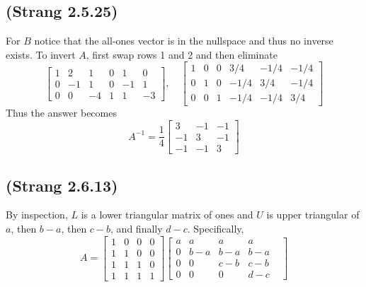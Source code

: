 \documentclass[10pt]{article}
\begin{document}
\subsection{(Strang 2.5.25)}
For $B$ notice that the all-ones vector is in the nullspace and thus no inverse exists. To invert $A$, first swap rows 1 and 2 and then eliminate
\[
\begin{bmatrix}	
1& 2& 1&    0&1& 0\\
0& -1& 1&   0&-1& 1\\
0& 0& -4&   1&1& -3
\end{bmatrix},\quad
\begin{bmatrix}	
1& 0& 0&    3/4&-1/4& -1/4\\
0& 1& 0&   -1/4&3/4 &-1/4\\
0& 0& 1&  -1/4& -1/4 &3/4
\end{bmatrix}
\]
Thus the answer becomes 
\[A^{-1} = \frac{1}{4}
\begin{bmatrix}
3& -1& -1 \\
-1&3&-1\\
-1&-1&3	
\end{bmatrix}
\]

\subsection{(Strang 2.6.13)}
By inspection, $L$ is a lower triangular matrix of ones and $U$ is upper triangular of $a$, then $b-a$, then $c-b$, and finally $d-c$. Specifically,
\[A = \begin{bmatrix}
 1& 0& 0& 0\\
 1& 1& 0& 0\\
 1& 1& 1& 0\\
 1& 1& 1& 1	
 \end{bmatrix}\begin{bmatrix}
a& a& a& a\\
0& b-a& b-a& b-a\\
0& 0& c-b& c-b&\\
0&0&0&d-c	
\end{bmatrix}
\]
\end{document}
